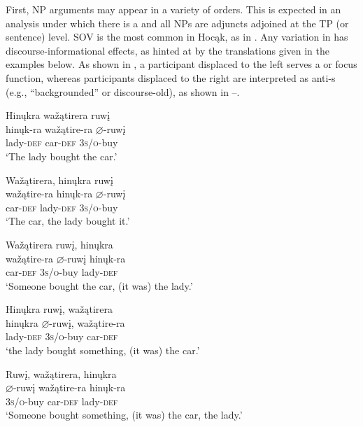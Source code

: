 \documentclass[output=paper]{LSP/langsci}
\begin{document}
First, NP arguments may appear in a variety of orders.  This is expected in an analysis under which there is a  and all NPs are adjuncts adjoined at the TP (or sentence) level. SOV  is the most common in Hocąk, as in . Any variation in  has discourse-informational effects, as hinted at by the  translations given in the examples below. As shown in , a participant displaced to the left serves a  or focus function, whereas participants displaced to the right are interpreted as anti-s (e.g., ``backgrounded'' or discourse-old), as shown in --.

\ea
\label{ex:jrs:11} 
\glll Hin\k{u}kra wa\v{z}ątirera ruw\k{i}  \\
hin\k{u}k-ra	wa\v{z}ątire-ra 	$\varnothing$-ruw\k{i} \\
lady-\textsc{def}	car-\textsc{def}	 \textsc{3s/o}-buy \\
\trans `The lady bought the car.'
\z

\ea\label{ex:jrs:12}
\ea\label{ex:jrs:12a}
\glll Wa\v{z}ątirera,	hin\k{u}kra		ruw\k{i} \\
wa\v{z}ątire-ra 	hin\k{u}k-ra		$\varnothing$-ruw\k{i} \\
car-\textsc{def}			lady-\textsc{def}		\textsc{3s/o}-buy \\
\trans `The car, the lady bought it.' 

\ex\label{ex:jrs:12b}
\glll Wa\v{z}ątirera		ruw\k{i},			hin\k{u}kra\\
wa\v{z}ątire-ra	$\varnothing$-ruw\k{i}	hin\k{u}k-ra \\
car-\textsc{def} 			\textsc{3s/o}-buy 	lady-\textsc{def} \\
\trans `Someone bought the car, (it was) the lady.' 

\ex\label{ex:jrs:12c}
\glll Hin\k{u}kra 		ruw\k{i}, 		wa\v{z}ątirera \\
hin\k{u}kra 	$\varnothing$-ruw\k{i}, 		wa\v{z}ątire-ra \\
lady-\textsc{def} \textsc{3s/o}-buy car-\textsc{def} \\
\trans `the lady bought something, (it was) the car.' 

\ex\label{ex:jrs:12d}
\glll Ruw\k{i}, 		wa\v{z}ątirera,	hin\k{u}kra\\
$\varnothing$-ruw\k{i}	wa\v{z}ątire-ra	hin\k{u}k-ra \\
\textsc{3s/o}-buy car-\textsc{def} lady-\textsc{def} \\
\trans `Someone bought something, (it was) the car, the lady.' 
\end{document}
